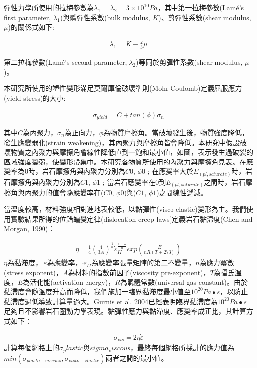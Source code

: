 彈性力學所使用的拉梅參數為$\lambda_1 = \lambda_2 = 3 \times 10^{10} Pa$，其中第一拉梅參數(Lamé's first parameter, $\lambda_1$)與體彈性系數(bulk modulus, $K$)、剪彈性系數(shear modulus, $\mu$)的關係式如下:

\begin{align}
\lambda_1 = K - \frac{2}{3}\mu
\end{align}

第二拉梅參數(Lamé's second parameter, $\lambda_2$)等同於剪彈性系數(shear modulus, $\mu$)。

本研究所使用的塑性變形滿足莫爾庫倫破壞準則(Mohr-Coulomb)定義屈服應力(yield stress)的大小:

\begin{align}
    \sigma_{yield}=C+tan(\phi)\sigma_{n}\label{eqn:elastic tensor}
\end{align}

其中$C$為內聚力，$\sigma_n$為正向力，$\phi$為物質摩擦角。當破壞發生後，物質強度降低，發生應變弱化(strain weakening)，其內聚力與摩擦角皆會降低。本研究中假設破壞物質之內聚力與摩擦角會線性降低直到一飽和最小值，如圖，表示發生過破裂的區域強度變弱，使變形帶集中。本研究各物質所使用的內聚力與摩擦角見表。在應變率為$0$時，岩石摩擦角與內聚力分別為$C0$, $\phi0$ ; 在應變率大於$E_(pl,saturate)$時，岩石摩擦角與內聚力分別為$C1$, $\phi1$ ; 當岩石應變率在0到$E_(pl,saturate)$之間時，岩石摩擦角與內聚力的值會隨應變率在($C0$, $\phi0$)與($C1$, $\phi1$)之間線性遞減。


當溫度較高，材料強度相對進地表較低，以黏彈性(visco-elastic)變形為主。我們使用實驗結果所得的位錯蠕變定律(dislocation creep laws)定義岩石黏滯度(Chen and Morgan, 1990)：

\begin{align}
   \eta=\frac{1}{4}(\frac{4}{3A})^{\frac{1}{n}} \dot\varepsilon_{II}^{\frac{1-n}{n}} exp(\frac{E}{nR(T+273)})
   \label{eqn:viscousity}
\end{align}
$\eta$為黏滯度，$\cdot\varepsilon$為應變率，$\cdot\varepsilon_{II}$為應變率張量矩陣的第二不變量，$n$為應力冪數(stress exponent)，$A$為材料的指數前因子(viscosity pre-exponent)，$T$為攝氏溫度，$E$為活化能(activation energy)，$R$為氣體常數(universal gas constant)。由於黏滯度會隨溫度升高而降低，我們施加一臨界黏滯度最小值至$10^20 Pa∙s$，以防止黏滯度過低導致計算量過大。Gurnis et al. 2004已經表明臨界黏滯度為$10^20 Pa∙s$足夠且不影響岩石圈動力學表現。黏彈性應力與黏滯度、應變率成正比，其計算方式如下：	

\begin{align}
    \sigma_{vis} = 2\eta\dot\varepsilon \label{eqn:viscous tensor}
\end{align}
計算每個網格上的$\sigma_plastic$與$sigma_viscous$，最終每個網格所採計的應力值為$min(\sigma_{plasto-viscous}, \sigma_{visto-elastic})$兩者之間的最小值。

